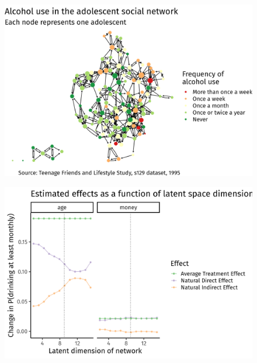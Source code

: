 \documentclass{beamer}
\theoremstyle{remark}
\begin{document}
\begin{frame}
    \centering
    \vspace{3mm}
    \begin{figure}
        \includegraphics[width=\textwidth]{figures/glasgow-alcohol.png}
    \end{figure}
\end{frame}

\begin{frame}
    \centering
    \vspace{3mm}
    \begin{figure}
        \includegraphics[width=\textwidth]{figures/glasgow-estimates.png}
    \end{figure}
\end{frame}
\end{document}
